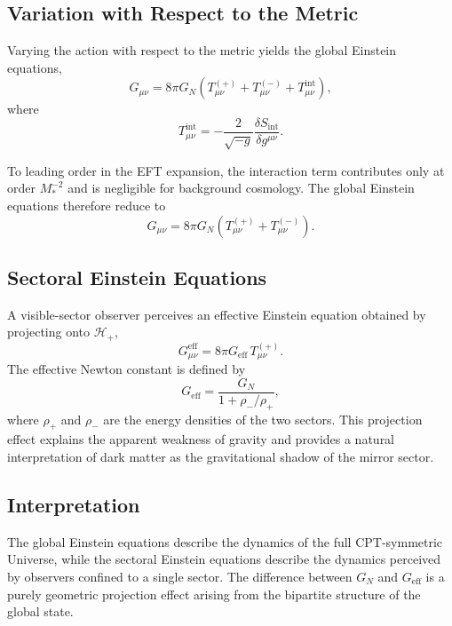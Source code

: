 \documentclass[11pt,a4paper]{article}
\begin{document}
\subsection{Variation with Respect to the Metric}

Varying the action with respect to the metric yields the global Einstein equations,
\begin{equation}
G_{\mu\nu} = 8\pi G_N \left( T_{\mu\nu}^{(+)} + T_{\mu\nu}^{(-)} + T_{\mu\nu}^{\mathrm{int}} \right),
\end{equation}
where
\begin{equation}
T_{\mu\nu}^{\mathrm{int}} = -\frac{2}{\sqrt{-g}} \frac{\delta S_{\mathrm{int}}}{\delta g^{\mu\nu}}.
\end{equation}

To leading order in the EFT expansion, the interaction term contributes only at order $M_*^{-2}$ and is negligible for background cosmology. The global Einstein equations therefore reduce to
\begin{equation}
G_{\mu\nu} = 8\pi G_N \left( T_{\mu\nu}^{(+)} + T_{\mu\nu}^{(-)} \right).
\end{equation}

\subsection{Sectoral Einstein Equations}

A visible-sector observer perceives an effective Einstein equation obtained by projecting onto $\mathcal{H}_+$,
\begin{equation}
G_{\mu\nu}^{\mathrm{eff}} = 8\pi G_{\mathrm{eff}} \, T_{\mu\nu}^{(+)}.
\end{equation}
The effective Newton constant is defined by
\begin{equation}
G_{\mathrm{eff}} = \frac{G_N}{1 + \rho_-/\rho_+},
\end{equation}
where $\rho_+$ and $\rho_-$ are the energy densities of the two sectors. This projection effect explains the apparent weakness of gravity and provides a natural interpretation of dark matter as the gravitational shadow of the mirror sector.

\subsection{Interpretation}

The global Einstein equations describe the dynamics of the full CPT-symmetric Universe, while the sectoral Einstein equations describe the dynamics perceived by observers confined to a single sector. The difference between $G_N$ and $G_{\mathrm{eff}}$ is a purely geometric projection effect arising from the bipartite structure of the global state.
\end{document}
